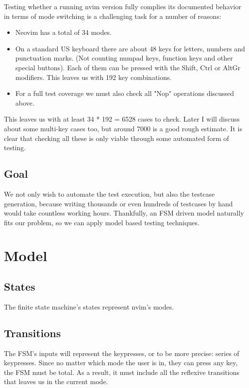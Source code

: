 \documentclass[12pt]{article}
\begin{document}
		Testing whether a running nvim version fully complies its documented behavior in terms of mode switching is a challenging task for a number of reasons:

		\begin{itemize}
			\item{Neovim has a total of 34 modes.}
			\item{On a standard US keyboard there are about 48 keys for letters, numbers and punctuation marks. (Not counting numpad keys, function keys and other special buttons). Each of them can be pressed with the Shift, Ctrl or AltGr modifiers. This leaves us with 192 key combinations.}
			\item{For a full test coverage we must also check all "Nop" operations discussed above.}
		\end{itemize}

		This leaves us with at least 34 * 192 = 6528 cases to check. Later I will discuss about some multi-key cases too, but around 7000 is a good rough estimate. It is clear that checking all these is only viable through some automated form of testing.

	\subsection{Goal}

		We not only wish to automate the test execution, but also the testcase generation, because writing thousands or even hundreds of testcases by hand would take countless working hours. Thankfully, an FSM driven model naturally fits our problem, so we can apply model based testing techniques.

\section{Model}

	\subsection{States}

		The finite state machine's states represent nvim's modes.

	\subsection{Transitions}

		The FSM's inputs will represent the keypresses, or to be more precise: series of keypresses. Since no matter which mode the user is in, they can press any key, the FSM must be total. As a result, it must include all the reflexive transitions that leaves us in the current mode.
\end{document}
